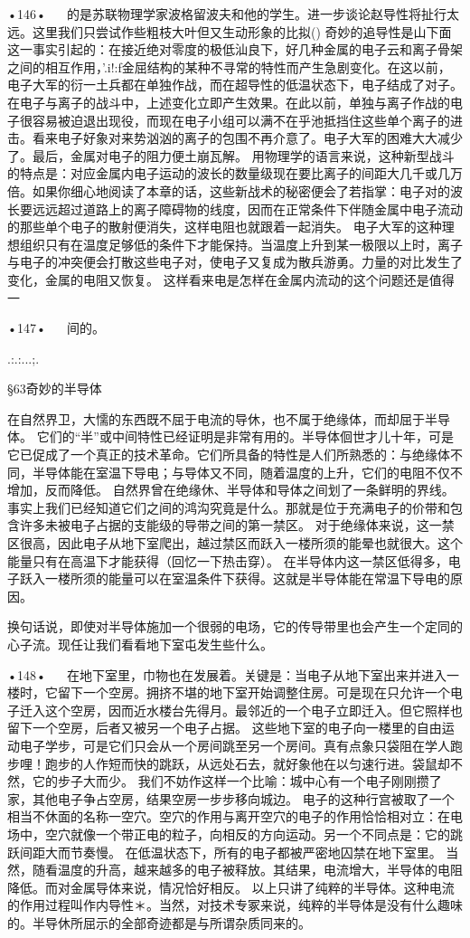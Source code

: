 {•146•
  
的是苏联物理学家波格留波夫和他的学生。进一步谈论赵导性将扯行太远。这里我们只尝试作些粗枝大叶但又生动形象的比拟()
奇妙的追导性是山下面这一事实引起的：在接近绝对零度的极低汕良下，好几种金属的电子云和离子骨架之间的相互作用，'.i!:f金屈结构的某种不寻常的特性而产生急剧变化。在这以前，电子大军的衍一土兵都在单独作战，而在超导性的低温状态下，电子结成了对子。
在电子与离子的战斗中，上述变化立即产生效果。在此以前，单独与离子作战的电子很容易被迫退出现役，而现在电子小组可以满不在乎池抵挡住这些单个离子的进击。看来电子好象对来势汹汹的离子的包围不再介意了。电子大军的困难大大减少了。最后，金属对电子的阻力便土崩瓦解。
用物理学的语言来说，这种新型战斗的特点是：对应金属内电子运动的波长的数量级现在要比离子的间距大几千或几万倍。如果你细心地阅读了本章的话，这些新战术的秘密便会了若指掌：电子对的波长要远远超过道路上的离子障碍物的线度，因而在正常条件下伴随金属中电子流动的那些单个电子的散射便消失，这样电阻也就跟着一起消失。
电子大军的这种理想组织只有在温度足够低的条件下才能保持。当温度上升到某一极限以上时，离子与电子的冲突便会打散这些电子对，使电子又复成为散兵游勇。力量的对比发生了变化，金属的电阻又恢复。
这样看来电是怎样在金属内流动的这个问题还是值得一

•147•
  
间的。
 

.:.:...;.
 

§63奇妙的半导体

 
在自然界卫，大懦的东西既不屈于电流的导休，也不属于绝缘体，而却屈于半导体。
它们的“半”或中间特性已经证明是非常有用的。半导体佪世才儿十年，可是它已促成了一个真正的技术革命。它们所具备的特性是人们所熟悉的：与绝缘体不同，半导体能在室温下导电；与导体又不同，随着温度的上升，它们的电阻不仅不增加，反而降低。
自然界曾在绝缘休、半导体和导体之间划了一条鲜明的界线。事实上我们已经知道它们之间的鸿沟究竟是什么。那就是位于充满电子的价带和包含许多未被电子占据的支能级的导带之间的第一禁区。
对于绝缘体来说，这一禁区很高，因此电子从地下室爬出，越过禁区而跃入一楼所须的能晕也就很大。这个能量只有在高温下才能获得（回忆一下热击穿）。
在半导体内这一禁区低得多，电子跃入一楼所须的能量可以在室温条件下获得。这就是半导体能在常温下导电的原因。

换句话说，即使对半导体施加一个很弱的电场，它的传导带里也会产生一个定同的心子流。现任让我们看看地下室屯发生些什么。

•148•
  
在地下室里，巾物也在发展着。关键是：当电子从地下室出来并进入一楼时，它留下一个空房。拥挤不堪的地下室开始调整住房。可是现在只允许一个电子迁入这个空房，因而近水楼台先得月。最邻近的一个电子立即迁入。但它照样也留下一个空房，后者又被另一个电子占据。
这些地下室的电子向一楼里的自由运动电子学步，可是它们只会从一个房间跳至另一个房间。真有点象只袋阻在学人跑步哩！跑步的人作短而快的跳跃，从远处石去，就好象他在以匀速行进。袋鼠却不然，它的步子大而少。
我们不妨作这样一个比喻：城中心有一个电子刚刚攒了家，其他电子争占空房，结果空房一步步移向城边。
电子的这种行宫被取了一个相当不休面的名称一空穴。空穴的作用与离开空穴的电子的作用恰恰相对立：在电场中，空穴就像一个带正电的粒子，向相反的方向运动。另一个不同点是：它的跳跃间距大而节奏慢。
在低温状态下，所有的电子都被严密地囚禁在地下室里。
当然，随看温度的升高，越来越多的电子被释放。其结果，电流增大，半导体的电阻降低。而对金属导体来说，情况恰好相反。
以上只讲了纯粹的半导体。这种电流的作用过程叫作内导性＊。当然，对技术专冢来说，纯粹的半导体是没有什么趣味的。半导休所屈示的全部奇迹都是与所谓杂质同来的。

}
